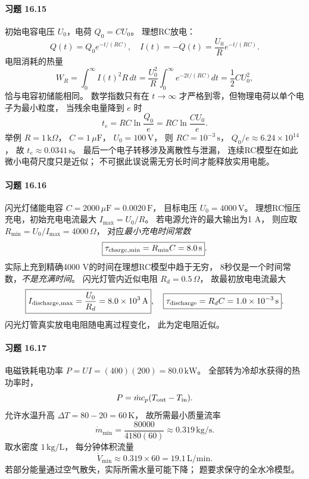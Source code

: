 \paragraph{习题 16.15}
初始电容电压 \(U_0\)，电荷
\(Q_0=CU_0\)。
理想RC放电：
\[
 Q(t)=Q_0e^{-t/(RC)},\quad
 I(t)=-\dot Q(t)=\frac{U_0}{R}e^{-t/(RC)}.
\]
电阻消耗的热量
\[
 W_R=\int_0^\infty I(t)^2R\,dt
 =\frac{U_0^2}{R}\int_0^\infty
 e^{-2t/(RC)}dt
 =\boxed{\frac12CU_0^2},
\]
恰与电容初储能相同。
数学指数只有在 \(t\to\infty\)
才严格到零，但物理电荷以单个电子为最小粒度，
当残余电量降到 \(e\) 时
\[
 \boxed{t_e=RC\ln\frac{Q_0}{e}
 =RC\ln\frac{CU_0}{e}}.
\]
举例 \(R=1\,\mathrm{k}\Omega\)，
\(C=1\,\mu\mathrm F\)，
\(U_0=100\,\mathrm V\)，
则 \(RC=10^{-3}\,\mathrm s\)，
\(Q_0/e\approx6.24\times10^{14}\)，
故
\(t_e\approx0.0341\,\mathrm s\)。
最后一个电子转移涉及离散性与泄漏，
连续RC模型在如此微小电荷尺度只是近似；
不可据此误说需无穷长时间才能释放实用电能。

\paragraph{习题 16.16}
闪光灯储能电容
\(C=2000\,\mu\mathrm F=0.0020\,\mathrm F\)，
目标电压 \(U_0=4000\,\mathrm V\)。
理想RC恒压充电，初始充电电流最大
\(I_{\max}=U_0/R\)。
若电源允许的最大输出为1 A，
则应取
\(R_{\min}=U_0/I_{\max}=4000\,\Omega\)，
对应\emph{最小充电时间常数}
\[
 \boxed{\tau_{\rm charge,min}
 =R_{\min}C=8.0\,\mathrm s}.
\]
实际上充到精确4000 V的时间在理想RC模型中趋于无穷，
8秒仅是一个时间常数，\emph{不是充满时间}。
闪光灯管内近似电阻 \(R_d=0.5\,\Omega\)，
故最初放电电流最大
\[
 \boxed{I_{\rm discharge,max}=
 \frac{U_0}{R_d}=8.0\times10^3\,\mathrm A},\quad
 \boxed{\tau_{\rm discharge}=R_dC
 =1.0\times10^{-3}\,\mathrm s}.
\]
闪光灯管真实放电电阻随电离过程变化，
此为定电阻近似。

\paragraph{习题 16.17}
电磁铁耗电功率
\(P=UI=(400)(200)=80.0\,\mathrm{kW}\)。
全部转为冷却水获得的热功率时，
\[
 P=\dot m c_p(T_{\rm out}-T_{\rm in}).
\]
允许水温升高
\(\Delta T=80-20=60\,\mathrm K\)，
故所需最小质量流率
\[
 \dot m_{\min}=\frac{80000}{4180(60)}
 \approx0.319\,\mathrm{kg/s}.
\]
取水密度 \(1\,\mathrm{kg/L}\)，
每分钟体积流量
\[
 \boxed{\dot V_{\min}\approx0.319\times60
 =19.1\,\mathrm{L/min}}.
\]
若部分能量通过空气散失，实际所需水量可能下降；
题要求保守的全水冷模型。

